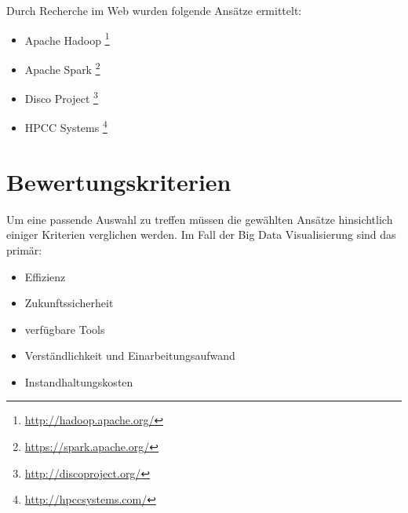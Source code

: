 \documentclass[paper=a4, fontsize=11pt]{scrartcl}
\begin{document}
Durch Recherche im Web wurden folgende Ans\"atze ermittelt:
\begin{itemize}
\item Apache Hadoop \footnote{\url{http://hadoop.apache.org/}}
\item Apache Spark \footnote{\url{https://spark.apache.org/}}
\item Disco Project \footnote{\url{http://discoproject.org/}}
\item HPCC Systems \footnote{\url{http://hpccsystems.com/}}
\end{itemize}

\section{Bewertungskriterien}
Um eine passende Auswahl zu treffen m\"ussen die gew\"ahlten Ans\"atze hinsichtlich einiger Kriterien verglichen werden.
Im Fall der Big Data Visualisierung sind das prim\"ar:

\begin{itemize}
 \item Effizienz 
 \item Zukunftssicherheit
 \item verf\"ugbare Tools
 \item Verst\"andlichkeit und Einarbeitungsaufwand
 \item Instandhaltungskosten
\end{itemize} 
\end{document}
